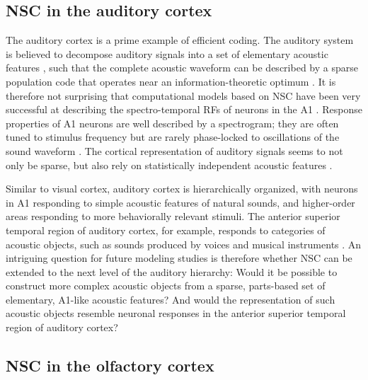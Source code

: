 \subsection*{NSC in the auditory cortex}

The auditory cortex is a prime example of efficient coding. The auditory system is believed to decompose auditory signals into
a set of elementary acoustic features \cite{SmithLewicki2006},
such that the complete acoustic waveform can be described by a
sparse population code that operates near an information-theoretic optimum
\cite{SmithLewicki2006,rokem2006,Hromadka2008}.
It is therefore not surprising that computational models based on \ac{NSC}
have been very successful at describing the spectro-temporal \acp{RF}
of neurons in the \ac{A1} \cite{Martinez2015,David2007}.
Response properties of \ac{A1} neurons are well described by a spectrogram;
they are often tuned to stimulus frequency but are rarely phase-locked
to oscillations of the sound waveform \cite{Leaver2010}.
The cortical representation of auditory signals seems to not only be sparse,
but also rely on statistically independent acoustic features \cite{Klein2003}.

Similar to visual cortex, auditory cortex is hierarchically organized,
with neurons in \ac{A1} responding to simple acoustic features of natural sounds,
and higher-order areas responding to more behaviorally relevant stimuli.
The anterior superior temporal region of auditory cortex, for example,
responds to categories of acoustic objects,
such as sounds produced by voices and musical instruments
\cite{Leaver2010}.
An intriguing question for future modeling studies is therefore 
whether \ac{NSC} can be extended to the next level of the auditory hierarchy:
Would it be possible to construct more complex acoustic objects from a sparse,
parts-based set of elementary, \ac{A1}-like acoustic features?
And would the representation of such acoustic objects resemble neuronal responses
in the anterior superior temporal region of auditory cortex?


\subsection*{NSC in the olfactory cortex}

